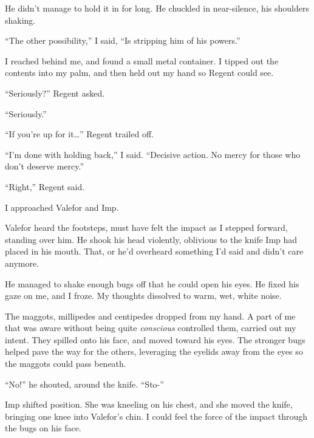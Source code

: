 He didn't manage to hold it in for long.  He chuckled in near-silence, his shoulders shaking.



``The other possibility,'' I said, ``Is stripping him of his powers.''



I reached behind me, and found a small metal container.  I tipped out the contents into my palm, and then held out my hand so Regent could see.



``Seriously?'' Regent asked.



``Seriously.''



``If you're up for it\ldots'' Regent trailed off.



``I'm done with holding back,'' I said.  ``Decisive action.  No mercy for those who don't deserve mercy.''



``Right,'' Regent said.



I approached Valefor and Imp.



Valefor heard the footsteps, must have felt the impact as I stepped forward, standing over him.  He shook his head violently, oblivious to the knife Imp had placed in his mouth.   That, or he'd overheard something I'd said and didn't care anymore.



He managed to shake enough bugs off that he could open his eyes.  He fixed his gaze on me, and I froze.  My thoughts dissolved to warm, wet, white noise.



The maggots, millipedes and centipedes dropped from my hand.  A part of me that was aware without being quite \emph{conscious} controlled them, carried out my intent.  They spilled onto his face, and moved toward his eyes.  The stronger bugs helped pave the way for the others, leveraging the eyelids away from the eyes so the maggots could pass beneath.



``No!'' he shouted, around the knife.  ``Sto-''



Imp shifted position.  She was kneeling on his chest, and she moved the knife, bringing one knee into Valefor's chin.  I could feel the force of the impact through the bugs on his face.



